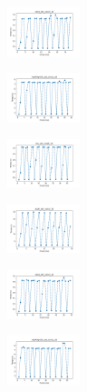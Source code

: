 \begin{figure}[H]
\begin{subfigure}
        \centering
        \includegraphics[width=0.234\textwidth]{img/ils-es/rand_set_const_10_277451237_time.png}
    \end{subfigure}
    \hfill
    \begin{subfigure}
        \centering
        \includegraphics[width=0.234\textwidth]{img/ils-es/newthyroid_set_const_10_277451237_time.png}
    \end{subfigure}
    \hfill
    \begin{subfigure}
        \centering
        \includegraphics[width=0.234\textwidth]{img/ils-es/iris_set_const_10_49258669_time.png}
    \end{subfigure}
    \hfill
    \begin{subfigure}
        \centering
        \includegraphics[width=0.234\textwidth]{img/ils-es/ecoli_set_const_10_49258669_time.png}
    \end{subfigure}
    \hfill
    \begin{subfigure}
        \centering
        \includegraphics[width=0.234\textwidth]{img/ils-es/rand_set_const_10_49258669_time.png}
    \end{subfigure}
    \hfill
    \begin{subfigure}
        \centering
        \includegraphics[width=0.234\textwidth]{img/ils-es/newthyroid_set_const_10_49258669_time.png}

\end{subfigure}
\end{figure}
